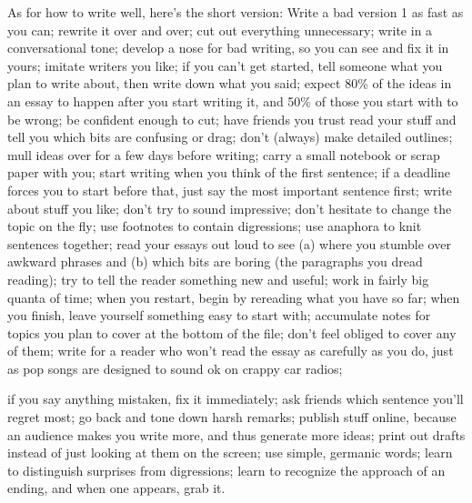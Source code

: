 As for how to write well,
                  here's the short version: Write a bad version 1 as fast as you
                  can; rewrite it over and over; cut out everything
                  unnecessary; write in a conversational tone; develop a nose
                  for bad writing, so you can see and fix it in yours; imitate
                  writers you like; if you can't get started, tell someone what
                  you plan to write about, then write down what you said; expect
                  80\% of the ideas in an essay to happen after you start writing
                  it, and 50\% of those you start with to be wrong; be confident
                  enough to cut; have friends you trust read your stuff and tell
                  you which bits are confusing or drag; don't (always) make
                  detailed outlines; mull ideas over for a few days before
                  writing; carry a small notebook or scrap paper with you; start
                  writing when you think of the first sentence; if a deadline
                  forces you to start before that, just say the most important
                  sentence first; write about stuff you like; don't try to sound
                  impressive; don't hesitate to change the topic on the fly; use
                  footnotes to contain digressions; use anaphora to knit
                  sentences together; read your essays out loud to see (a) where
                  you stumble over awkward phrases and (b) which bits are boring
                  (the paragraphs you dread reading); try to tell the reader
                  something new and useful; work in fairly big quanta of time;
                  when you restart, begin by rereading what you have so far;
                  when you finish, leave yourself something easy to start with;
                  accumulate notes for topics you plan to cover at the bottom of
                  the file; don't feel obliged to cover any of them; write for a
                  reader who won't read the essay as carefully as you do, just
                  as pop songs are designed to sound ok on crappy car radios;
                  
                  if you say anything mistaken, fix it immediately; ask friends
                  which sentence you'll regret most; go back and tone down harsh
                  remarks; publish stuff online, because an audience makes you
                  write more, and thus generate more ideas; print out drafts
                  instead of just looking at them on the screen; use simple,
                  germanic words; learn to distinguish surprises from
                  digressions; learn to recognize the approach of an ending, and
                  when one appears, grab it.


